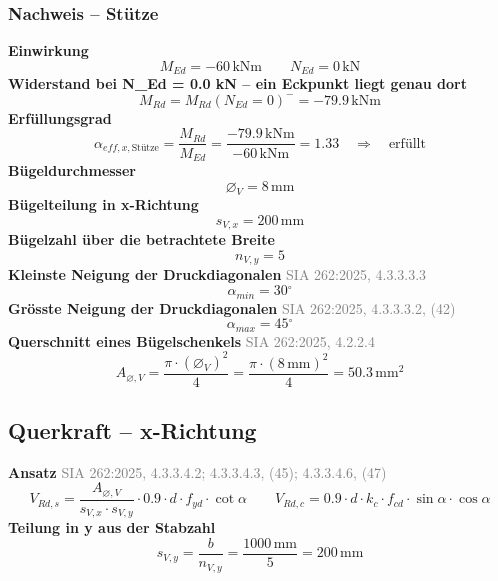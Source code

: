 \documentclass[11pt,a4paper]{article}
\newcommand{\normref}[1]{{\small\textcolor{gray}{#1}}}
\begin{document}
\subsubsection{Nachweis – Stütze}
\noindent\textbf{Einwirkung}
\begin{equation*}
M_{Ed} = -60\,\mathrm{kNm} \qquad N_{Ed} = 0\,\mathrm{kN}
\end{equation*}
\noindent\textbf{Widerstand bei N\_Ed = 0.0 kN – ein Eckpunkt liegt genau dort}
\begin{equation*}
M_{Rd} = M_{Rd}(N_{Ed}=0)^{-} = -79.9\,\mathrm{kNm}
\end{equation*}
\noindent\textbf{Erfüllungsgrad}
\begin{equation*}
\alpha_{eff,x,\text{Stütze}} = \frac{M_{Rd}}{M_{Ed}} = \frac{-79.9\,\mathrm{kNm}}{-60\,\mathrm{kNm}} = 1.33 \quad \Rightarrow \quad \text{erfüllt}
\end{equation*}
\noindent\textbf{Bügeldurchmesser}
\begin{equation*}
\varnothing_{V} = 8\,\mathrm{mm}
\end{equation*}
\noindent\textbf{Bügelteilung in x-Richtung}
\begin{equation*}
s_{V,x} = 200\,\mathrm{mm}
\end{equation*}
\noindent\textbf{Bügelzahl über die betrachtete Breite}
\begin{equation*}
n_{V,y} = 5
\end{equation*}
\noindent\textbf{Kleinste Neigung der Druckdiagonalen} \hfill \normref{SIA 262:2025, 4.3.3.3.3}
\begin{equation*}
\alpha_{min} = 30{}^{\circ}
\end{equation*}
\noindent\textbf{Grösste Neigung der Druckdiagonalen} \hfill \normref{SIA 262:2025, 4.3.3.3.2, (42)}
\begin{equation*}
\alpha_{max} = 45{}^{\circ}
\end{equation*}
\noindent\textbf{Querschnitt eines Bügelschenkels} \hfill \normref{SIA 262:2025, 4.2.2.4}
\begin{equation*}
A_{\varnothing,V} = \frac{\pi \cdot \left(\varnothing_{V}\right)^{2}}{4} = \frac{\pi \cdot \left(8\,\mathrm{mm}\right)^{2}}{4} = 50.3\,\mathrm{mm}^{2}
\end{equation*}
\subsection{Querkraft – x-Richtung}
\noindent\textbf{Ansatz} \hfill \normref{SIA 262:2025, 4.3.3.4.2; 4.3.3.4.3, (45); 4.3.3.4.6, (47)}
\begin{equation*}
V_{Rd,s} = \frac{A_{\varnothing,V}}{s_{V,x} \cdot s_{V,y}} \cdot 0.9 \cdot d \cdot f_{yd} \cdot \cot\alpha \qquad V_{Rd,c} = 0.9 \cdot d \cdot k_c \cdot f_{cd} \cdot \sin\alpha \cdot \cos\alpha
\end{equation*}
\noindent\textbf{Teilung in y aus der Stabzahl}
\begin{equation*}
s_{V,y} = \frac{b}{n_{V,y}} = \frac{1000\,\mathrm{mm}}{5} = 200\,\mathrm{mm}
\end{equation*}
\end{document}
